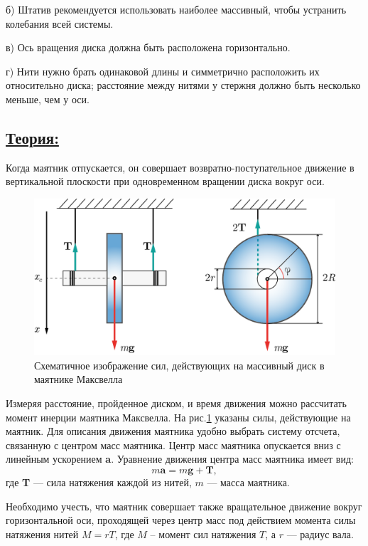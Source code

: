 \documentclass[14pt,a4paper,oneside]{extarticle}	%
\begin{document}
б) Штатив рекомендуется использовать наиболее массивный, чтобы устранить колебания всей системы.

в) Ось вращения диска должна быть расположена горизонтально.

г) Нити нужно брать одинаковой длины и симметрично расположить их относительно диска; расстояние между нитями у стержня должно быть несколько меньше, чем у оси.
	
\newpage
\subsection*{\underline{Теория:}}
		
	 Когда маятник отпускается, он совершает возвратно-поступательное движение в вертикальной плоскости при одновременном вращении диска вокруг оси.
	
		\begin{figure}[H] 	
		\centering 	
		\includegraphics[width=0.9\linewidth]{Maxwell-3.png}
		\caption{Схематичное изображение сил, действующих на массивный диск в маятнике Максвелла}
		\label{Maxwell-3}
	\end{figure}
	 
	Измеряя расстояние, пройденное диском, и время движения можно рассчитать момент инерции маятника Максвелла.
	На рис.\ref{Maxwell-3} указаны силы, действующие на маятник.
	Для описания движения маятника удобно выбрать систему отсчета, связанную с центром масс маятника.
	Центр масс маятника опускается вниз с линейным ускорением \textbf{a}.
	Уравнение движения центра масс маятника имеет вид:
	\begin{equation}\label{Maxwell-1eq1}
	m\textbf{a} = m\textbf{g} + \textbf{T},
	\end{equation}
	где \textbf{T}  — сила натяжения каждой из нитей, $ m $ — масса маятника.
	
	Необходимо учесть, что маятник совершает также вращательное движение вокруг горизонтальной оси, проходящей через центр масс под действием момента силы натяжения нитей $ M = r T $, где $ M $ – момент сил натяжения $ T $, а $ r $ — радиус вала.
	
\end{document}
